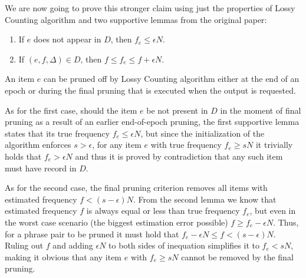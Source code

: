 We are now going to prove this stronger claim using just the properties of Lossy Counting
algorithm and two supportive lemmas from the original paper:
\begin{enumerate}
  \item If $e$ does not appear in $D$, then $f_{e} \leq \epsilon N$.
  \item If $(e,f,\Delta) \in D$, then $f \leq f_{e} \leq f + \epsilon N$.
\end{enumerate}

An item $e$ can be pruned off by Lossy Counting algorithm either at the end of an epoch or
during the final pruning that is executed when the output is requested.

As for the first case, should the item $e$ be not present in $D$ in the moment of final
pruning as a result of an earlier end-of-epoch pruning, the first supportive lemma states
that its true frequency $f_e \leq \epsilon N$, but since the initialization of the algorithm
enforces $s > \epsilon$, for any item $e$ with true frequency $f_{e} \geq sN$ it trivially
holds that $f_{e} > \epsilon N$ and thus it is proved by contradiction that any such item
must have record in $D$.

As for the second case, the final pruning criterion removes all items with estimated frequency
$f < (s - \epsilon)N$. From the second lemma we know that estimated frequency $f$ is always
equal or less than true frequency $f_{e}$, but even in the worst case scenario (the biggest
estimation error possible) $f \geq f_{e} - \epsilon N$.
Thus, for a phrase pair to be pruned it must hold that $f_{e} - \epsilon N \leq f < (s - \epsilon) N$.
Ruling out $f$ and adding $\epsilon N$ to both sides of inequation simplifies it to $f_{e} < sN$,
making it obvious that any item $e$ with $f_{e} \geq sN$ cannot be removed by the final pruning.

